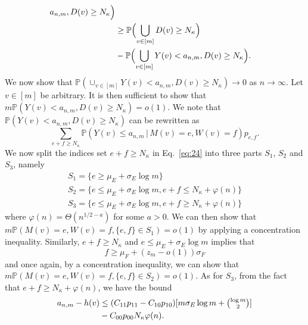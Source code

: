 \documentclass[10pt,journal,compsoc]{IEEEtran}
\theoremstyle{definition}
\begin{document}
\begin{IEEEproof}[Lemma~8]
\begin{IEEEproof}[Eq.~\eqref{eq:30}]
\begin{equation*}
\begin{split}
      a_{n,m}, D(v) \geq N_\kappa \Bigr) \\
      & \geq \mathbb{P}\Bigl(\bigcup_{v \in [m]} D(v) \geq
      N_\kappa\Bigr) \\ &- \mathbb{P}\Bigl( \bigcup_{v
        \in [m]} Y(v) < a_{n,m}, D(v) \geq N_\kappa\Bigr).
    \end{split}
  \end{equation*}
  We now show that $\mathbb{P}( \cup_{v
        \in [m]} Y(v) < a_{n,m}, D(v) \geq N_\kappa) \rightarrow 0$ as
      $n \rightarrow \infty$. Let $v \in [m]$ be arbitrary. It is then
      sufficient to show that $m\mathbb{P}(Y(v) < a_{n,m}, D(v) \geq
      N_{\kappa}) = o(1)$. We note that $\mathbb{P}(Y(v) < a_{n,m}, D(v) \geq
      N_{\kappa})$ can be rewritten as
      \begin{equation}
        \label{eq:24}
        \sum_{e + f \geq N_{\kappa}}{\mathbb{P}(Y(v) \leq a_{n,m} \, |
          \, M(v) = e, W(v) =
          f)}p_{e,f}.
      \end{equation}
We now split the indices set $e + f \geq N_{\kappa}$ in
Eq.~\eqref{eq:24} into three parts $S_1$, $S_2$ and $S_3$, namely
\begin{gather}
  \label{eq:32}
    S_1 = \{  e \geq
        \mu_E + \sigma_E \log{m}\} \\
    S_2 = \{  e \leq
        \mu_E + \sigma_E \log{m},e + f \leq
        N_\kappa + \varphi(n)\} \\
    S_3 = \{ e \leq \mu_E + \sigma_E \log{m}, e + f \geq
        N_\kappa + \varphi(n)\}
\end{gather}
where $\varphi(n) = \Theta(n^{1/2 - a})$ for some $a > 0$. We can then
show that $m\mathbb{P}(M(v) = e,
W(v) =f, \{e,f\} \in S_1) = o(1)$ by applying a concentration
inequality. Similarly, $e + f \geq N_{\kappa}$ and $e \leq \mu_{E}
+ \sigma_{E} \log{m}$ implies that
\begin{equation}
  \label{eq:33}
  f \geq \mu_{F} + (z_{m} - o(1)) \sigma_F 
\end{equation}
and once again, by a concentration inequality, we can show that $m
\mathbb{P}(M(v) = e, W(v) = f, \{e,f\} \in S_2) = o(1)$. As for
$S_3$, from the fact that $e + f \geq N_{\kappa} + \varphi(n)$, we have the bound
  \begin{equation}
    \begin{split}
    a_{n,m} - h(v) &\leq (C_{11} p_{11} - C_{10} p_{10})[m \sigma_E
    \log{m} + \tbinom{\log{m}}{2}] \\ &- C_{00}p_{00} N_\kappa
    \varphi(n).
    \end{split}

\end{equation}
\end{IEEEproof}
\end{IEEEproof}
\end{document}
